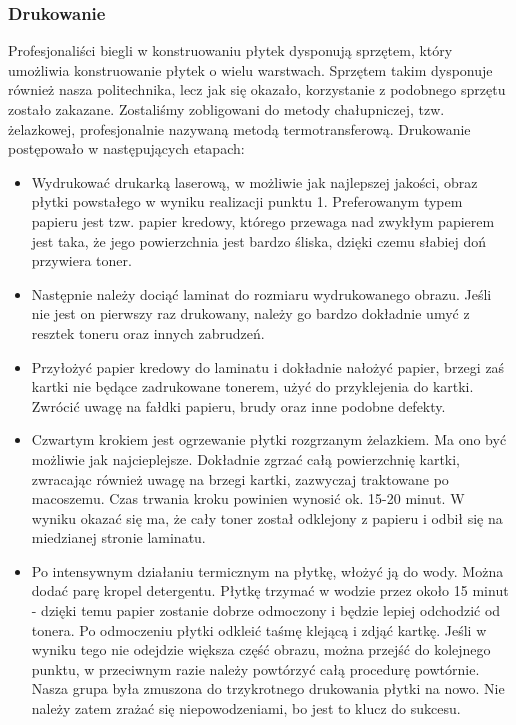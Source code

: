 \subsubsection{Drukowanie}

Profesjonaliści biegli w konstruowaniu płytek dysponują sprzętem, który umożliwia konstruowanie płytek o wielu warstwach. Sprzętem takim dysponuje również nasza politechnika, lecz jak się okazało, korzystanie z podobnego sprzętu zostało zakazane. Zostaliśmy zobligowani do metody chałupniczej, tzw. żelazkowej, profesjonalnie nazywaną metodą termotransferową. Drukowanie postępowało w następujących etapach: 

\begin{itemize}
\item Wydrukować drukarką laserową, w możliwie jak najlepszej jakości, obraz płytki powstałego w wyniku realizacji punktu 1. Preferowanym typem papieru jest tzw. papier kredowy, którego przewaga nad zwykłym papierem jest taka, że  jego powierzchnia jest bardzo śliska, dzięki czemu słabiej doń przywiera toner.
\item Następnie należy dociąć laminat do rozmiaru wydrukowanego obrazu. Jeśli nie jest on pierwszy raz drukowany, należy go bardzo dokładnie umyć z resztek toneru oraz innych zabrudzeń.
\item Przyłożyć papier kredowy do laminatu i dokładnie nałożyć papier, brzegi zaś kartki nie będące zadrukowane tonerem, użyć do przyklejenia do kartki. Zwrócić uwagę na fałdki papieru, brudy oraz inne podobne defekty.
\item Czwartym krokiem jest ogrzewanie płytki rozgrzanym żelazkiem. Ma ono być możliwie jak najcieplejsze. Dokładnie zgrzać całą powierzchnię kartki, zwracając również uwagę na brzegi kartki, zazwyczaj traktowane po macoszemu. Czas trwania kroku powinien wynosić ok. 15-20 minut. W wyniku okazać się ma, że cały toner został odklejony z papieru i odbił się na miedzianej stronie laminatu.
\item Po intensywnym działaniu termicznym na płytkę, włożyć ją do wody. Można dodać parę kropel detergentu. Płytkę trzymać w wodzie przez około 15 minut - dzięki temu papier zostanie dobrze odmoczony i będzie lepiej odchodzić od tonera. Po odmoczeniu płytki odkleić taśmę klejącą i zdjąć kartkę. Jeśli w wyniku tego nie odejdzie większa część obrazu, można przejść do kolejnego punktu, w przeciwnym razie należy powtórzyć całą procedurę powtórnie. Nasza grupa była zmuszona do trzykrotnego drukowania płytki na nowo. Nie należy zatem zrażać się niepowodzeniami, bo jest to klucz do sukcesu.

\end{itemize}
